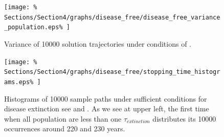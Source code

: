 \begin{figure}[p]
	\centering
	\texttt{[image: \%
		Sections/Section4/graphs/disease\_free/disease\_free\_variance\_population.eps\%
	]}
	\caption{
		Variance of \num{10000} solution trajectories under conditions of 
		.
	}\label{fig:variance_free_disease}
\end{figure}
%
%
\begin{figure}[p]
	\centering
	\texttt{[image: \%
		Sections/Section4/graphs/disease\_free/stopping\_time\_histograms.eps\%
	]}
	\caption{
		Histograms of \num{10 000} sample paths under sufficient conditions for
		disease extinction see 
		and . As we  see at upper left, the 
		first time when all population are less than one $\tau_{extinction}$ 
		distributes its \num{10 000} occurrences around \num{220} and \num{230} 
		\si{years}.
	}\label{fig:extinction_stopping_time_histograms}
\end{figure}